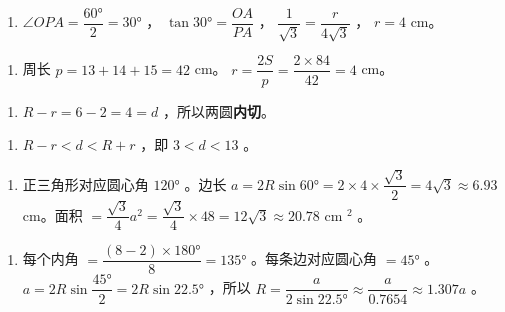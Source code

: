 \begin{answer}
\begin{enumerate}
  \item $\angle OPA = \dfrac{60°}{2} = 30°$ ， $\tan 30° = \dfrac{OA}{PA}$ ， $\dfrac{1}{\sqrt{3}} = \dfrac{r}{4\sqrt{3}}$ ， $r = 4$ cm。
\end{enumerate}


\begin{enumerate}
  \item 周长 $p = 13 + 14 + 15 = 42$ cm。 $r = \dfrac{2S}{p} = \dfrac{2 \times 84}{42} = 4$ cm。
\end{enumerate}


\begin{enumerate}
  \item $R - r = 6 - 2 = 4 = d$ ，所以两圆\textbf{内切}。
\end{enumerate}


\begin{enumerate}
  \item $R - r < d < R + r$ ，即 $3 < d < 13$ 。
\end{enumerate}


\begin{enumerate}
  \item 正三角形对应圆心角 $120°$ 。边长 $a = 2R\sin 60° = 2 \times 4 \times \dfrac{\sqrt{3}}{2} = 4\sqrt{3} \approx 6.93$ cm。面积 $= \dfrac{\sqrt{3}}{4}a^2 = \dfrac{\sqrt{3}}{4} \times 48 = 12\sqrt{3} \approx 20.78$ cm $^2$ 。
\end{enumerate}


\begin{enumerate}
  \item 每个内角 $= \dfrac{(8-2) \times 180°}{8} = 135°$ 。每条边对应圆心角 $= 45°$ 。 $a = 2R\sin\dfrac{45°}{2} = 2R\sin 22.5°$ ，所以 $R = \dfrac{a}{2\sin 22.5°} \approx \dfrac{a}{0.7654} \approx 1.307a$ 。
\end{enumerate}


\end{answer}
